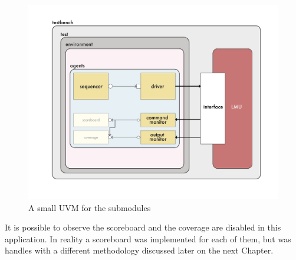 \begin{figure}[H]
    \centering
    \includegraphics[scale = 0.5]{Chapter_1/img/sub-uvm.png}
    \caption{A small UVM for the submodules}
    \label{sub-uvm}
\end{figure}

It is possible to observe the scoreboard and the coverage are disabled in this application. In reality a scoreboard was implemented for each of them, but was handles with a different methodology discussed later on the next Chapter.